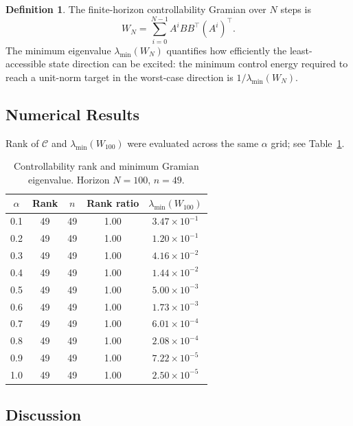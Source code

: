 \documentclass[11pt,a4paper]{article}
\theoremstyle{definition}
\newtheorem{definition}{Definition}[section]
\begin{document}
\begin{definition}
  The finite-horizon controllability Gramian over $N$ steps is
  \begin{equation}
    W_N = \sum_{i=0}^{N-1} A^i B B^{\top} (A^i)^{\top}.
    \label{eq:gramian}
  \end{equation}
  The minimum eigenvalue $\lambda_{\min}(W_N)$ quantifies how efficiently the
  least-accessible state direction can be excited: the minimum control energy
  required to reach a unit-norm target in the worst-case direction is
  $1/\lambda_{\min}(W_N)$.
\end{definition}

\subsection{Numerical Results}

Rank of $\mathcal{C}$ and $\lambda_{\min}(W_{100})$ were evaluated across the
same $\alpha$ grid; see Table~\ref{tab:ctrl}.

\begin{table}[ht]
  \centering
  \caption{Controllability rank and minimum Gramian eigenvalue.
           Horizon $N = 100$, $n = 49$.}
  \label{tab:ctrl}
  \begin{tabular}{ccccc}
    \toprule
    $\alpha$ & Rank & $n$ & Rank ratio & $\lambda_{\min}(W_{100})$ \\
    \midrule
    0.1 & 49 & 49 & 1.00 & $3.47 \times 10^{-1}$  \\
    0.2 & 49 & 49 & 1.00 & $1.20 \times 10^{-1}$  \\
    0.3 & 49 & 49 & 1.00 & $4.16 \times 10^{-2}$  \\
    0.4 & 49 & 49 & 1.00 & $1.44 \times 10^{-2}$  \\
    0.5 & 49 & 49 & 1.00 & $5.00 \times 10^{-3}$  \\
    0.6 & 49 & 49 & 1.00 & $1.73 \times 10^{-3}$  \\
    0.7 & 49 & 49 & 1.00 & $6.01 \times 10^{-4}$  \\
    0.8 & 49 & 49 & 1.00 & $2.08 \times 10^{-4}$  \\
    0.9 & 49 & 49 & 1.00 & $7.22 \times 10^{-5}$  \\
    1.0 & 49 & 49 & 1.00 & $2.50 \times 10^{-5}$  \\
    \bottomrule
  \end{tabular}
\end{table}

\subsection{Discussion}
\end{document}
